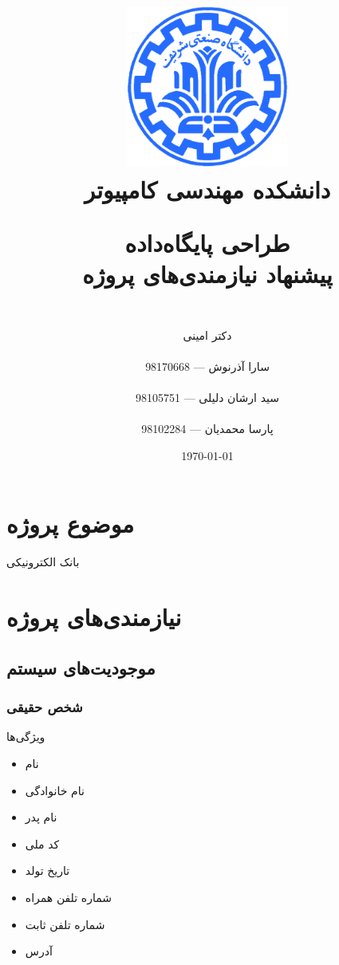 \documentclass{article}
\title{
\includegraphics[width=0.4\textwidth]{sharif.png}\\
\normalsize{دانشکده مهندسی کامپیوتر}\\
\vspace{1cm}
	
\huge{طراحی پایگاه‌داده}
\\ \vspace{.8cm}
\Large{پیشنهاد نیازمندی‌های پروژه}
}
\author{
\\
دکتر امینی
\\ \vspace{.4cm}
\\
  سارا آذرنوش       ---      98170668
\\ \vspace{0.2cm} \\
  سید ارشان دلیلی       ---      98105751
\\ \vspace{0.2cm} \\
  پارسا محمدیان       ---      98102284
\\ \vspace{.4cm}
}
\date{\today}
\begin{document}
\clearpage
\maketitle
\thispagestyle{empty}

\newpage

\clearpage
\pagestyle{fancy}


\tableofcontents

\newpage

\setcounter{page}{1}

\section{موضوع پروژه}
بانک الکترونیکی

\section{نیازمندی‌های پروژه}

    \subsection{موجودیت‌های سیستم}

        \subsubsection{شخص حقیقی}
            ویژگی‌ها
            \begin{itemize}
                \item نام
                \item نام خانوادگی
                \item نام پدر
                \item کد ملی
                \item تاریخ تولد
                \item شماره تلفن همراه
                \item شماره تلفن ثابت
                \item آدرس
            \end{itemize}
\end{document}
